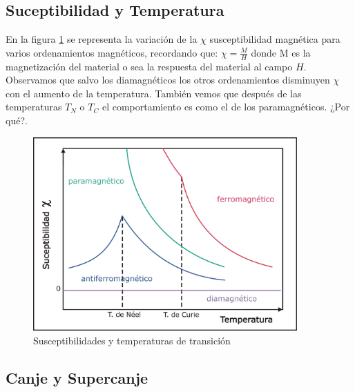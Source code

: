 \subsection{Suceptibilidad y Temperatura}

En la figura \ref{fig:suceptibilidades0} se representa la variación de la $\chi$ susceptibilidad
magnética para varios ordenamientos magnéticos, recordando que: $\chi=\frac{M}{H}$ donde {M} es la magnetización del material o sea la respuesta del material al campo $H$. Observamos que salvo los diamagnéticos los
otros ordenamientos disminuyen $\chi$ con el aumento de la temperatura.
También vemos que después de las temperaturas $T_{N}$ o $T_{C}$ el
comportamiento es como el de los paramagnéticos. ¿Por qué?.

\begin{figure}[H]
    \centering
    \includegraphics[width=0.9\textwidth]{./Figures/suceptibilidades}
	\caption{Susceptibilidades y temperaturas de transición}
	\label{fig:suceptibilidades0}
\end{figure}

\subsection{Canje y Supercanje}

